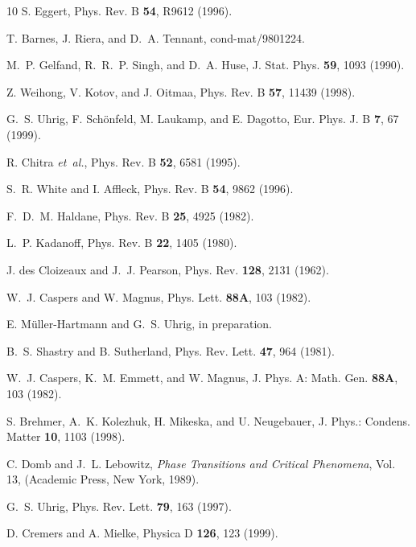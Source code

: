 \begin{thebibliography}{10}
S. Eggert, Phys. Rev. B {\bf 54},  R9612  (1996).

T. Barnes, J. Riera, and D.~A. Tennant, cond-mat/9801224.

M.~P. Gelfand, R.~R.~P. Singh, and D.~A. Huse, J. Stat. Phys. {\bf 59},  1093
  (1990).

Z. Weihong, V. Kotov, and J. Oitmaa, Phys. Rev. B {\bf 57},  11439  (1998).

G.~S. Uhrig, F. Sch\"onfeld, M. Laukamp, and E. Dagotto, Eur. Phys. J. B {\bf
  7},  67  (1999).

R. Chitra {\it et~al.}, Phys. Rev. B {\bf 52},  6581  (1995).

S.~R. White and I. Affleck, Phys. Rev. B {\bf 54},  9862  (1996).

F.~D.~M. Haldane, Phys. Rev. B {\bf 25},  4925  (1982).

L.~P. Kadanoff, Phys. Rev. B {\bf 22},  1405  (1980).

J. des Cloizeaux and J.~J. Pearson, Phys. Rev. {\bf 128},  2131  (1962).

W.~J. Caspers and W. Magnus, Phys. Lett. {\bf 88A},  103  (1982).

E. M\"uller-Hartmann and G.~S. Uhrig, in preparation.

B.~S. Shastry and B. Sutherland, Phys. Rev. Lett. {\bf 47},  964  (1981).

W.~J. Caspers, K.~M. Emmett, and W. Magnus, J. Phys. A: Math. Gen. {\bf 88A},
  103  (1982).

S. Brehmer, A.~K. Kolezhuk, H. Mikeska, and U. Neugebauer, J. Phys.: Condens.
  Matter {\bf 10},  1103  (1998).

C. Domb and J.~L. Lebowitz, {\it Phase Transitions and
  Critical Phenomena}, Vol. 13, (Academic Press, New York, 1989). 

G.~S. Uhrig, Phys. Rev. Lett. {\bf 79},  163  (1997).

D. Cremers and A. Mielke, Physica D {\bf 126},  123  (1999).
\end{thebibliography}


\appendix

